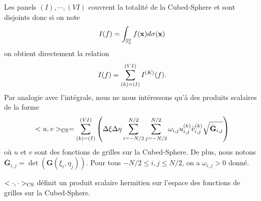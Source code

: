 Les panels $(I), \cdots, (VI)$ couvrent la totalité de la Cubed-Sphere et sont disjoints donc si on note
\begin{equation}
I(f) = \displaystyle\int_{\mathbb{S}_a^2}f(\mathbf{x}) d \sigma(\mathbf{x})
\end{equation}
on obtient directement la relation
\begin{equation}
I(f) = \displaystyle\sum\limits_{(k)=(I)}^{(VI)} I^{(K)}(f).
\end{equation}
Par analogie avec l'intégrale, nous ne nous intéressons qu'à des produits scalaires de la forme
\begin{equation}
<u, v>_{\text{CS}} = \displaystyle\sum\limits_{(k)=(I)}^{(VI)} \left( \Delta \xi \Delta \eta \displaystyle\sum\limits_{i=-N/2}^{N/2} \displaystyle\sum\limits_{j=-N/2}^{N/2} \omega_{i,j} u_{i,j}^{(k)} \bar{v}_{i,j}^{(k)} \sqrt{\bar{\mathbf{G}}_{i,j}} \right)
\end{equation}
où $u$ et $v$ sont des fonctions de grilles sur la Cubed-Sphere. De plus, nous notons $\bar{\mathbf{G}}_{i,j} = \det (\mathbf{G}(\xi_i, \eta_j))$. Pour tous $-N/2 \leq i,j \leq N/2$, on a $\omega_{i,j}>0$ donné.

\begin{proposition}
$<\cdot, \cdot>_{\text{CS}}$ définit un produit scalaire hermitien sur l'espace des fonctions de grilles sur la Cubed-Sphere.
\end{proposition}

